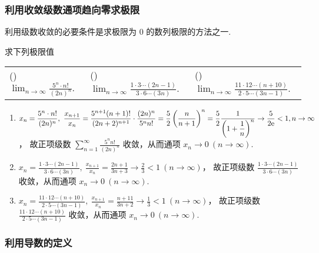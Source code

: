 \subsubsection{利用收敛级数通项趋向零求极限}

利用级数收敛的必要条件是求极限为 $0$ 的数列极限的方法之一.

\begin{example}
    求下列极限值
    \setcounter{magicrownumbers}{0}
    \begin{table}[H]
        \centering
        \begin{tabular}{l | l | l}
            (\rownumber{}) $\displaystyle\lim_{n\to\infty}\frac{5^n\cdot n!}{(2n)^n}.$ & (\rownumber{}) $\displaystyle\lim_{n\to\infty}\frac{1\cdot3\cdots(2n-1)}{3\cdot 6\cdots(3n)}.$ & (\rownumber{}) $\displaystyle\lim_{n\to\infty}\frac{11\cdot12\cdots(n+10)}{2\cdot5\cdots(3n-1)}.$ \\
        \end{tabular}
    \end{table}
\end{example}
\begin{solution}
    \begin{enumerate}[label=(\arabic{*})]
        \item $\displaystyle x_n=\frac{5^n\cdot n!}{(2n)^n},~\frac{x_{n+1}}{x_n}=\frac{5^{n+1}(n+1)!}{(2n+2)^{n+1}}\cdot\frac{(2n)^n}{5^nn!}=\frac{5}{2}\left(\frac{n}{n+1}\right)^n=\frac{5}{2}\frac{1}{\left(1+\dfrac{1}{n}\right)^n}\to\frac{5}{2\mathrm{e} }<1,n\to\infty$，
              故正项级数 $\displaystyle\sum_{n=1}^{\infty}\frac{5^nn!}{(2n)^n}$ 收敛，从而通项 $ x_n\to0~ (n\to\infty).$
        \item $\displaystyle x_n=\frac{1\cdot3\cdots(2n-1)}{3\cdot 6\cdots(3n)},~\frac{x_{n+1}}{x_n}=\frac{2n+1}{3n+3}\to\frac{2}{3}<1~ (n\to\infty)$，
              故正项级数 $\displaystyle\frac{1\cdot3\cdots(2n-1)}{3\cdot 6\cdots(3n)}$ 收敛，从而通项 $ x_n\to0~ (n\to\infty).$
        \item $\displaystyle x_n=\frac{11\cdot12\cdots(n+10)}{2\cdot 5\cdots(3n-1)},~\frac{x_{n+1}}{x_n}=\frac{n+11}{3n+2}\to\frac{1}{3}<1~ (n\to\infty)$，
              故正项级数 $\displaystyle\frac{11\cdot12\cdots(n+10)}{2\cdot 5\cdots(3n-1)}$ 收敛，从而通项 $ x_n\to0~ (n\to\infty).$
    \end{enumerate}
\end{solution}

\subsubsection{利用导数的定义}

